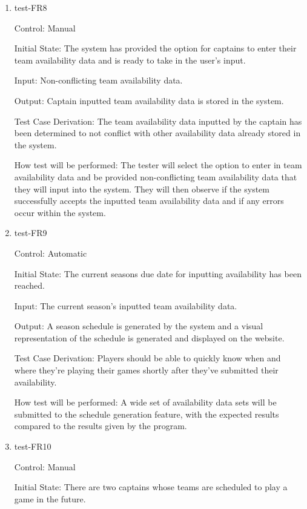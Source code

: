 \documentclass[12pt, titlepage]{article}
\begin{document}
\begin{enumerate}

  \item{test-FR8\\}

  Control: Manual

  Initial State: The system has provided the option for captains to enter their team
  availability data and is ready to take in the user's input.

  Input: Non-conflicting team availability data.

  Output: Captain inputted team availability data is stored in the system.

  Test Case Derivation: The team availability data inputted by the captain has been
  determined to not conflict with other availability data already stored in the system.

  How test will be performed: The tester will select the option to enter in team 
  availability data and be provided non-conflicting team availability
  data that they will input into the system. They will then observe if the system successfully
  accepts the inputted team availability data and if any errors occur within the system.

  \item{test-FR9\\}

  Control: Automatic

  Initial State: The current seasons due date for inputting availability
  has been reached.

  Input: The current season's inputted team availability data.

  Output: A season schedule is generated by the system and a visual
  representation of the schedule is generated and displayed on the website.

  Test Case Derivation: Players should be able to quickly know when and where
  they're playing their games shortly after they've submitted their availability.

  How test will be performed: A wide set of availability data sets will be
  submitted to the schedule generation feature, with the expected results
  compared to the results given by the program.

  \item{test-FR10\\}

  Control: Manual

  Initial State: There are two captains whose teams are scheduled to play a
  game in the future.


\end{enumerate}
\end{document}
